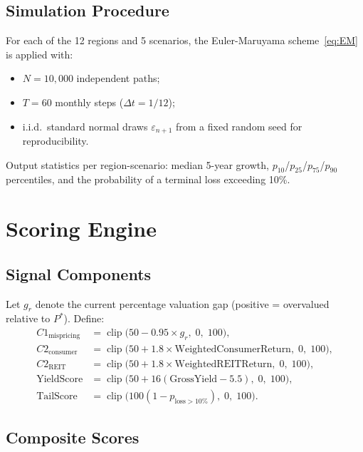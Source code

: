 \documentclass[11pt,a4paper]{article}
\theoremstyle{plain}
\theoremstyle{definition}
\newcommand{\Pstar}{P^{*}}
\newcommand{\clip}{\operatorname{clip}}
\begin{document}
\subsection{Simulation Procedure}

For each of the 12 regions and 5 scenarios, the Euler-Maruyama
scheme~\eqref{eq:EM} is applied with:
\begin{itemize}[leftmargin=1.8em]
  \item $N = 10{,}000$ independent paths;
  \item $T = 60$ monthly steps ($\Delta t = 1/12$);
  \item i.i.d.\ standard normal draws $\varepsilon_{n+1}$ from a fixed
        random seed for reproducibility.
\end{itemize}

Output statistics per region-scenario: median 5-year growth,
$p_{10}$/$p_{25}$/$p_{75}$/$p_{90}$ percentiles, and the probability
of a terminal loss exceeding 10\%.

\section{Scoring Engine}

\subsection{Signal Components}

Let $g_r$ denote the current percentage valuation gap
(positive = overvalued relative to $\Pstar$).  Define:
\begin{align}
  C1_{\mathrm{mispricing}}
  &= \clip\!\bigl(50 - 0.95\times g_r,\;0,\;100\bigr), \\
  C2_{\mathrm{consumer}}
  &= \clip\!\bigl(50 + 1.8\times\text{WeightedConsumerReturn},\;0,\;100\bigr), \\
  C2_{\mathrm{REIT}}
  &= \clip\!\bigl(50 + 1.8\times\text{WeightedREITReturn},\;0,\;100\bigr), \\
  \text{YieldScore}
  &= \clip\!\bigl(50 + 16(\text{GrossYield} - 5.5),\;0,\;100\bigr), \\
  \text{TailScore}
  &= \clip\!\bigl(100(1 - p_{\mathrm{loss}>10\%}),\;0,\;100\bigr).
\end{align}

\subsection{Composite Scores}
\end{document}
